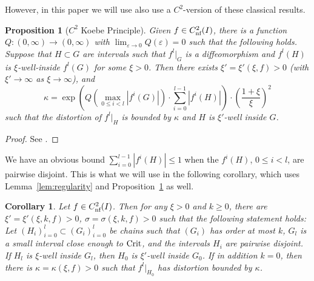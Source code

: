 \documentclass[12pt, psamsfonts, reqno]{amsart}
\newtheorem{proposition}[theorem]{Proposition}
\newtheorem{corollary}[theorem]{Corollary}
\begin{document}
However, in this paper we will use also use a $C^2$-version of
these classical results.

\begin{proposition}[$C^2$ Koebe Principle]
 \label{prop:koebe}
Given $f\in {C^2_{\text{\rm nf}}}(I)$, there is a function $Q:(0,\infty) \to
(0,\infty)$ with $\lim_{{\varepsilon} \to 0} Q({\varepsilon}) = 0$ such that the
following holds. Suppose that $H \subset G$ are intervals such
that $f^l|_G$ is a diffeomorphism and
 $f^l(H)$ is $\xi$-well-inside $f^l(G)$ for some $\xi > 0$.
Then there exists $\xi' = \xi'(\xi, f) > 0$ (with
$\xi' \to \infty$ as $\xi \to \infty$), and
\begin{equation}
\kappa = \exp\left( Q(\max_{0 \leq i < l} |f^i(G)|) \cdot
\sum_{i=0}^{l-1} |f^i(H)| \right) \cdot
\left(\frac{1+\xi}{\xi}\right)^2
\end{equation}
such that the distortion of $f^l|_H$ is bounded by $\kappa$ and
$H$ is $\xi'$-well inside $G$.
\end{proposition}

\begin{proof}
 See \cite[Proposition~2]{vSV}.
\end{proof}

We have an obvious bound $\sum_{i=0}^{l-1} |f^i(H)| \leq 1$ when
the $f^i(H)$, $0 \leq i < l$, are pairwise disjoint. This is what
we will use in the following corollary, which uses
Lemma~\ref{lem:regularity} and Proposition~\ref{prop:koebe} as
well.

\begin{corollary}
 \label{cor:disjointness}
Let $f\in {C^2_{\text{\rm nf}}}(I)$. Then for any $\xi>0$ and $k\geq 0$, there
are $\xi'=\xi'(\xi,k,f)>0$, $\sigma=\sigma(\xi,k,f)>0$  such that
the following statement holds: Let $(H_i)_{i=0}^l\subset
(G_i)_{i=0}^l$ be chains such that $(G_i)$ has order at most $k$,
$G_l$ is a small interval close enough to ${\mathop{\rm Crit}\nolimits}$, and the
intervals $H_i$ are pairwise disjoint. If $H_l$ is $\xi$-well
inside $G_l$, then  $H_0$ is $\xi'$-well inside $G_0$. If in
addition $k=0$, then there is $\kappa=\kappa(\xi,f)>0$ such that
$f^l|_{H_0}$ has distortion bounded by $\kappa$.
\end{corollary}
\end{document}
